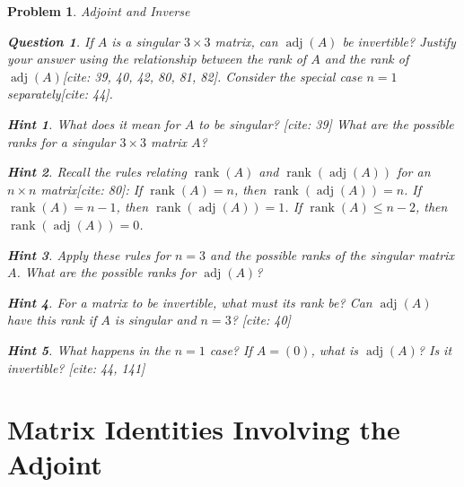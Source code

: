 \documentclass[12pt]{article}
\newtheorem{problem}{Problem}[section]
\newtheorem{question}{Question}[problem]
\theoremstyle{definition}
\newtheorem{hint}{Hint}[question]
\newcommand{\adj}{\operatorname{adj}}
\newcommand{\rank}{\operatorname{rank}}
\begin{document}
\begin{problem}{Adjoint and Inverse}
    \begin{question}
        If $A$ is a singular $3 \times 3$ matrix, can $\adj(A)$ be invertible? Justify your answer using the relationship between the rank of $A$ and the rank of $\adj(A)$[cite: 39, 40, 42, 80, 81, 82]. Consider the special case $n=1$ separately[cite: 44].
    \end{question}
    
        \begin{hint}
            What does it mean for $A$ to be singular? [cite: 39] What are the possible ranks for a singular $3 \times 3$ matrix $A$?
        \end{hint}
        \begin{hint}
            Recall the rules relating $\rank(A)$ and $\rank(\adj(A))$ for an $n \times n$ matrix[cite: 80]:
            If $\rank(A) = n$, then $\rank(\adj(A)) = n$.
            If $\rank(A) = n-1$, then $\rank(\adj(A)) = 1$.
            If $\rank(A) \leq n-2$, then $\rank(\adj(A)) = 0$.
        \end{hint}
        \begin{hint}
            Apply these rules for $n=3$ and the possible ranks of the singular matrix $A$. What are the possible ranks for $\adj(A)$?
        \end{hint}
        \begin{hint}
            For a matrix to be invertible, what must its rank be? Can $\adj(A)$ have this rank if $A$ is singular and $n=3$? [cite: 40]
        \end{hint}
         \begin{hint}
             What happens in the $n=1$ case? If $A=(0)$, what is $\adj(A)$? Is it invertible? [cite: 44, 141]
         \end{hint}
    
\end{problem}

\section{Matrix Identities Involving the Adjoint}
\end{document}
